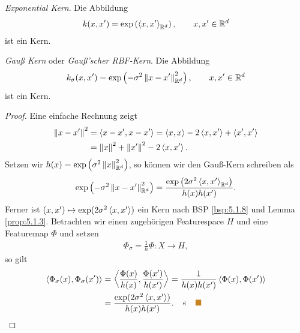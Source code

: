 \begin{bsp}
\label{bsp:5.1.8}
\textit{Exponential Kern}. Die Abbildung
\begin{align*}
k(x,x') = \exp\left(\left\langle x,x'\right\rangle_{\mathbb{R}^d} \right),\qquad x,x'\in\mathbb{R}^d
\end{align*}
ist ein Kern.\bsphere
\end{bsp}

\begin{bsp}
\label{bsp:5.1.9}
\textit{Gauß Kern} oder \textit{Gauß'scher RBF-Kern}. Die Abbildung
\begin{align*}
k_\sigma(x,x') = \exp\left(-\sigma^2\left\|x-x'\right\|_{\mathbb{R}^d}^2\right),\qquad
x,x'\in\mathbb{R}^d
\end{align*}
ist ein Kern.
\begin{proof}
Eine einfache Rechnung zeigt
\begin{align*}
\left\|x-x'\right\|^2 &= \left\langle x-x',x-x'\right\rangle = 
\left\langle x,x\right\rangle - 2\left\langle x,x'\right\rangle + \left\langle x',x'\right\rangle\\
&= \left\|x\right\|^2 + \left\|x'\right\|^2 - 2\left\langle x,x'\right\rangle.
\end{align*}
Setzen wir $h(x) = \exp\left(\sigma^2\left\|x\right\|_{\mathbb{R}^d}^2\right)$, so können wir
den Gauß-Kern schreiben als
\begin{align*}
\exp\left(-\sigma^2\left\|x-x'\right\|_{\mathbb{R}^d}^2\right)
=
\frac{\exp\left(2\sigma^2\left\langle x,x'\right\rangle_{\mathbb{R}^d}\right)}
{h(x)
h(x')}.
\end{align*}
Ferner ist $(x,x')\mapsto \exp(2\sigma^2\left\langle x,x'\right\rangle)$ ein Kern nach BSP
\ref{bsp:5.1.8} und Lemma \ref{prop:5.1.3}. Betrachten wir einen zugehörigen
Featurespace $H$ und eine Featuremap $\Phi$ und setzen
\begin{align*}
\Phi_\sigma = \frac{1}{h}\Phi : X\to H,
\end{align*}
so gilt
\begin{align*}
\lin{\Phi_\sigma(x),\Phi_\sigma(x')} &= 
\lin{\frac{\Phi(x)}{h(x)},\frac{\Phi(x')}{h(x')}}
= \frac{1}{h(x)h(x')} \lin{\Phi(x),\Phi(x')}\\
&= \frac{\exp(2\sigma^2\lin{x,x'})}{h(x)h(x')}.\qedhere\bsphere
\end{align*}
\end{proof}
\end{bsp}

